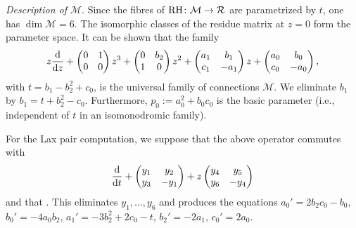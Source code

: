 \documentclass[pdftex]{sigma}
\numberwithin{equation}{section}
\begin{document}
 {\it Description of $\mathcal{M}$}. Since the fibres of ${\rm RH}\colon\mathcal{M}\rightarrow \mathcal{R}$ are
parametrized by $t$, one has $\dim \mathcal{M}=6$. The isomorphic classes of the residue matrix at $z=0$ form the parameter space.
It can be shown that the family
 \[ z\frac{{\rm d}}{{\rm d}z}+ \begin{pmatrix}0 & 1\\0& 0\end{pmatrix} z^3+
\begin{pmatrix} 0 &b_2\\1&0\end{pmatrix}z^2+
\begin{pmatrix} a_1 &b_1\\ c_1& -a_1\end{pmatrix} z+ \begin{pmatrix}a_0 & b_0 \\c_0& -a_0\end{pmatrix},\]
with $t=b_1-b_2^2+c_0$, is the universal family of connections $\mathcal{M}$. We eliminate $b_1$ by $b_1=t+b_2^2-c_0$.
Furthermore, $p_0:=a_0^2+b_0c_0$ is the basic parameter (i.e., independent of $t$ in an isomonodromic family).

For the Lax pair computation, we suppose that the above operator commutes with
\[
\frac{{\rm d}}{{\rm d}t}+\begin{pmatrix} y_1&y_2\\y_3& -y_1 \end{pmatrix}+z\begin{pmatrix} y_4& y_5\\y_6& -y_4 \end{pmatrix}
\]
 and that .
This eliminates $y_1,\dots ,y_6$ and produces the equations
$a_0'=2b_2c_0-b_0$, $ b_0'=-4a_0b_2$, $ a_1'=-3b_2^2+2c_0-t$, $ b_2'=-2a_1$, $ c_0'=2a_0$.
\end{document}
